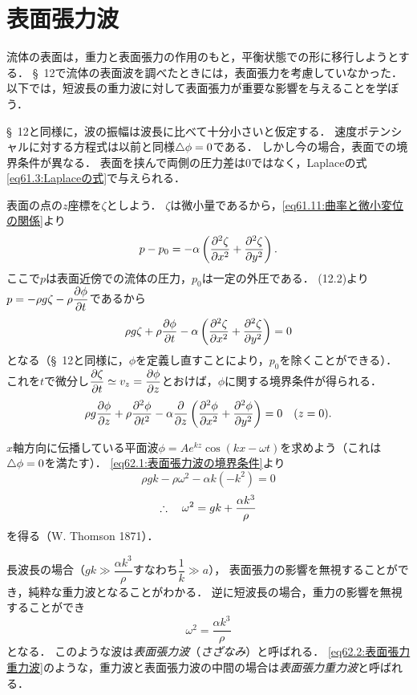 \section{表面張力波}

流体の表面は，重力と表面張力の作用のもと，平衡状態での形に移行しようとする．
\S~12で流体の表面波を調べたときには，表面張力を考慮していなかった．
以下では，短波長の重力波に対して表面張力が重要な影響を与えることを学ぼう．


\S~12と同様に，波の振幅は波長に比べて十分小さいと仮定する．
速度ポテンシャルに対する方程式は以前と同様$\triangle\phi=0$である．
しかし今の場合，表面での境界条件が異なる．
表面を挟んで両側の圧力差は0ではなく，Laplaceの式\eqref{eq61.3:Laplaceの式}で与えられる．

表面の点の$z$座標を$\zeta$としよう．
$\zeta$は微小量であるから，\eqref{eq61.11:曲率と微小変位の関係}より
\[
    p-p_0 = -\alpha \left( \pdv[2]{\zeta}{x} + \pdv[2]{\zeta}{y} \right).
\]
ここで$p$は表面近傍での流体の圧力，$p_0$は一定の外圧である．
(12.2)より$p = -\rho g\zeta - \rho \dpdv{\phi}{t}$であるから
\[
    \rho g\zeta + \rho \pdv{\phi}{t} -\alpha \left( \pdv[2]{\zeta}{x} + \pdv[2]{\zeta}{y} \right) = 0
\]
となる（\S~12と同様に，$\phi$を定義し直すことにより，$p_0$を除くことができる）．
これを$t$で微分し$\dpdv{\zeta}{t} \simeq v_z = \dpdv{\phi}{z}$とおけば，$\phi$に関する境界条件が得られる．
\begin{equation}\label{eq62.1:表面張力波の境界条件}
    \rho g \pdv{\phi}{z} + \rho \pdv[2]{\phi}{t} -\alpha \pdv{z} \left( \pdv[2]{\phi}{x} + \pdv[2]{\phi}{y} \right) = 0
    \quad (z=0) .
\end{equation}


$x$軸方向に伝播している平面波$\phi = A e^{kz} \cos(kx-\omega t)$を求めよう（これは$\triangle\phi=0$を満たす）．
\eqref{eq62.1:表面張力波の境界条件}より
\[
    \rho gk - \rho \omega^2 - \alpha k (-k^2) = 0
\]
\begin{equation}\label{eq62.2:表面張力重力波}
    \therefore\quad \omega^2 = gk + \frac{\alpha k^3}{\rho}
\end{equation}
を得る（W. Thomson 1871）．


長波長の場合（$gk \gg \dfrac{\alpha k^3}{\rho}$すなわち$\dfrac{1}{k} \gg a$），
表面張力の影響を無視することができ，純粋な重力波となることがわかる．
逆に短波長の場合，重力の影響を無視することができ
\begin{equation}
    \omega^2 = \frac{\alpha k^3}{\rho}
\end{equation}
となる．
このような波は\emph{表面張力波}（\emph{さざなみ}）と呼ばれる．
\eqref{eq62.2:表面張力重力波}のような，重力波と表面張力波の中間の場合は\emph{表面張力重力波}と呼ばれる．


\BackToTheToc